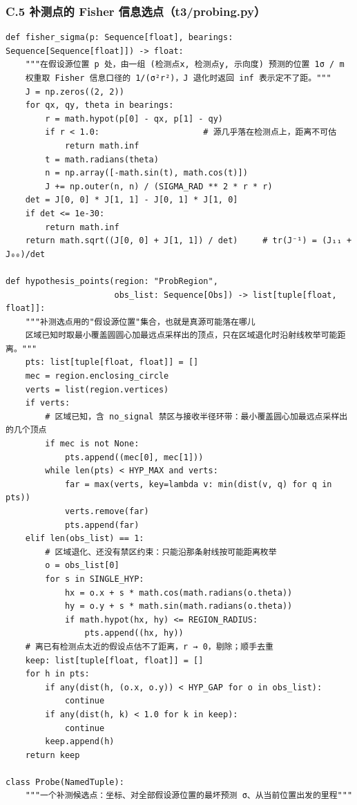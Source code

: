 \documentclass[UTF8, zihao=5,AutoFakeBold=2]{ctexart}
\begin{document}
	\subsubsection*{C.5 \quad 补测点的 Fisher 信息选点（t3/probing.py）}
	\begin{lstlisting}
def fisher_sigma(p: Sequence[float], bearings: Sequence[Sequence[float]]) -> float:
    """在假设源位置 p 处，由一组 (检测点x, 检测点y, 示向度) 预测的位置 1σ / m
    权重取 Fisher 信息口径的 1/(σ²r²)，J 退化时返回 inf 表示定不了距。"""
    J = np.zeros((2, 2))
    for qx, qy, theta in bearings:
        r = math.hypot(p[0] - qx, p[1] - qy)
        if r < 1.0:                     # 源几乎落在检测点上，距离不可估
            return math.inf
        t = math.radians(theta)
        n = np.array([-math.sin(t), math.cos(t)])
        J += np.outer(n, n) / (SIGMA_RAD ** 2 * r * r)
    det = J[0, 0] * J[1, 1] - J[0, 1] * J[1, 0]
    if det <= 1e-30:
        return math.inf
    return math.sqrt((J[0, 0] + J[1, 1]) / det)     # tr(J⁻¹) = (J₁₁ + J₀₀)/det

def hypothesis_points(region: "ProbRegion",
                      obs_list: Sequence[Obs]) -> list[tuple[float, float]]:
    """补测选点用的"假设源位置"集合，也就是真源可能落在哪儿
    区域已知时取最小覆盖圆圆心加最远点采样出的顶点，只在区域退化时沿射线枚举可能距离。"""
    pts: list[tuple[float, float]] = []
    mec = region.enclosing_circle
    verts = list(region.vertices)
    if verts:
        # 区域已知，含 no_signal 禁区与接收半径环带：最小覆盖圆心加最远点采样出的几个顶点
        if mec is not None:
            pts.append((mec[0], mec[1]))
        while len(pts) < HYP_MAX and verts:
            far = max(verts, key=lambda v: min(dist(v, q) for q in pts))
            verts.remove(far)
            pts.append(far)
    elif len(obs_list) == 1:
        # 区域退化、还没有禁区约束：只能沿那条射线按可能距离枚举
        o = obs_list[0]
        for s in SINGLE_HYP:
            hx = o.x + s * math.cos(math.radians(o.theta))
            hy = o.y + s * math.sin(math.radians(o.theta))
            if math.hypot(hx, hy) <= REGION_RADIUS:
                pts.append((hx, hy))
    # 离已有检测点太近的假设点估不了距离，r → 0，剔除；顺手去重
    keep: list[tuple[float, float]] = []
    for h in pts:
        if any(dist(h, (o.x, o.y)) < HYP_GAP for o in obs_list):
            continue
        if any(dist(h, k) < 1.0 for k in keep):
            continue
        keep.append(h)
    return keep

class Probe(NamedTuple):
    """一个补测候选点：坐标、对全部假设源位置的最坏预测 σ、从当前位置出发的里程"""


\end{lstlisting}
\end{document}
